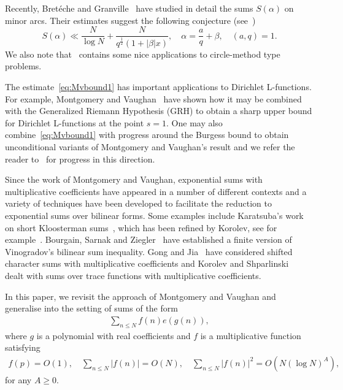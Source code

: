 \documentclass[12pt]{amsart}
\def\le{\leqslant}
\begin{document}
Recently, Bret\'{e}che and Granville~\cite{BreGra} have studied in detail the sums $S(\alpha)$ on minor arcs. Their estimates suggest the following conjecture (see~\cite[Equation~1.4]{BreGra})
\begin{equation*}
S(\alpha)\ll \frac{N}{\log N}+ \frac{N}{q^{\frac{1}{2}}(1+|\beta|x)}, \quad \alpha=\frac{a}{q}+\beta, \quad (a,q)=1.
\end{equation*}
We also note that~\cite{BreGra} contains some nice applications to circle-method type problems.

The estimate~\eqref{eq:Mvbound1} has important applications to Dirichlet L-functions. For example, Montgomery and Vaughan~\cite{M-V} have shown how it may be combined with the Generalized Riemann Hypothesis (GRH) to obtain a sharp upper bound for Dirichlet L-functions at the point $s=1$. One may also combine~\eqref{eq:Mvbound1} with progress around the Burgess bound to obtain unconditional variants of Montgomery and Vaughan's result and we refer the reader to~\cite{GS,Hildebrand,Hild1} for progress in this direction.


Since the work of Montgomery and Vaughan, exponential sums with multiplicative coefficients have appeared in a number of different contexts and a variety of techniques have been developed to facilitate the reduction to exponential sums over bilinear forms. Some examples include Karatsuba's work on short Kloosterman sums~\cite{Kar}, which has been refined by Korolev, see for example~\cite{Kor}. Bourgain, Sarnak and Ziegler~\cite{BSZ} have established a finite version of Vinogradov's bilinear sum inequality.  Gong and Jia~\cite{GJ} have considered shifted character sums with multiplicative coefficients and Korolev and Shparlinski~\cite{KS} dealt with sums over trace functions with multiplicative coefficients. 


In this paper, we revisit the approach of Montgomery and Vaughan and generalise into the setting of sums of the form 
\begin{align}
\label{eq:mv1}
\sum_{n\le N}f(n)e(g(n)),
\end{align}
where $g$ is a polynomial with real coefficients and $f$ is a multiplicative function satisfying 
\begin{align*}
f(p)=O(1), \quad \sum_{n\le N}|f(n)|=O(N), \quad \sum_{n\le N}|f(n)|^2=O(N(\log{N})^{A}),
\end{align*}
for any $A \geq 0$.
\end{document}
